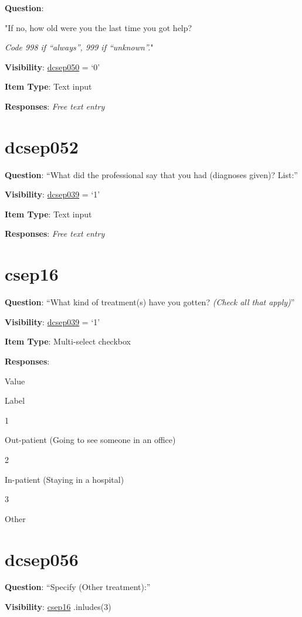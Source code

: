 \documentclass[]{book}
\begin{document}
\textbf{Question}:

"If no, how old were you the last time you got help?

\emph{Code 998 if ``always'', 999 if ``unknown''.}"

\textbf{Visibility}: \protect\hyperlink{dcsep050}{dcsep050} = `0'

\textbf{Item Type}: Text input

\textbf{Responses}: \emph{Free text entry}

\hypertarget{dcsep052}{%
\section{dcsep052}\label{dcsep052}}

\textbf{Question}: ``What did the professional say that you had (diagnoses given)? List:''

\textbf{Visibility}: \protect\hyperlink{dcsep039}{dcsep039} = `1'

\textbf{Item Type}: Text input

\textbf{Responses}: \emph{Free text entry}

\hypertarget{csep16}{%
\section{csep16}\label{csep16}}

\textbf{Question}: ``What kind of treatment(s) have you gotten? \emph{(Check all that apply)}''

\textbf{Visibility}: \protect\hyperlink{dcsep039}{dcsep039} = `1'

\textbf{Item Type}: Multi-select checkbox

\textbf{Responses}:

Value

Label

1

Out-patient (Going to see someone in an office)

2

In-patient (Staying in a hospital)

3

Other

\hypertarget{dcsep056}{%
\section{dcsep056}\label{dcsep056}}

\textbf{Question}: ``Specify (Other treatment):''

\textbf{Visibility}: \protect\hyperlink{csep16}{csep16} .inludes(3)
\end{document}
